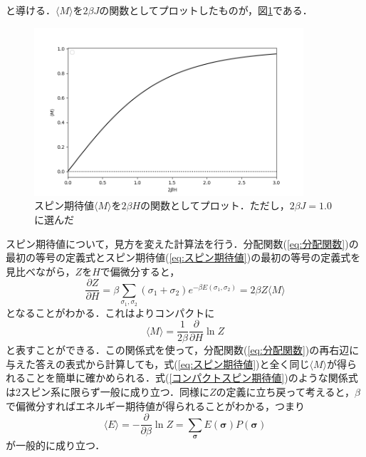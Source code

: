 \documentclass[a4paper,11pt]{jsarticle}
\begin{document}
と導ける．$\langle M \rangle$を$2\beta J$の関数としてプロットしたものが，図\ref{fig:spin_graph}である．\par
\begin{figure}[htbp]
  \begin{center}
    \includegraphics[width=100mm]{graph/fukushima(3_140).png}
    \caption{スピン期待値$\langle M \rangle$を$2\beta H$の関数としてプロット．ただし，$2\beta J = 1.0$に選んだ \label{fig:spin_graph} }
  \end{center}
\end{figure}

スピン期待値について，見方を変えた計算法を行う．分配関数(\ref{eq:分配関数})の最初の等号の定義式とスピン期待値(\ref{eq:スピン期待値})の最初の等号の定義式を見比べながら，$Z$を$H$で偏微分すると，
\begin{equation}
  \frac{\partial Z}{\partial H} = \beta \sum_{\sigma_1, \sigma_2}(\sigma_1 + \sigma_2)e^{-\beta E(\sigma_1, \sigma_2)} = 2\beta Z \langle M \rangle
\end{equation}
となることがわかる．これはよりコンパクトに
\begin{equation}
  \langle M \rangle = \frac{1}{2\beta} \frac{\partial}{\partial H} \ln{Z} \label{eq:コンパクトスピン期待値}
\end{equation}
と表すことができる．この関係式を使って，分配関数(\ref{eq:分配関数})の再右辺に与えた答えの表式から計算しても，式(\ref{eq:スピン期待値})と全く同じ$\langle M \rangle$が得られることを簡単に確かめられる．式(\ref{コンパクトスピン期待値})のような関係式は2スピン系に限らず一般に成り立つ．同様に$Z$の定義に立ち戻って考えると，$\beta$で偏微分すればエネルギー期待値が得られることがわかる，つまり
\begin{equation}
  \langle E \rangle = -\frac{\partial}{\partial \beta} \ln{Z} = \sum_{\bm{\sigma}} E(\bm{\sigma}) P(\bm{\sigma})
\end{equation}
が一般的に成り立つ．



\end{document}

